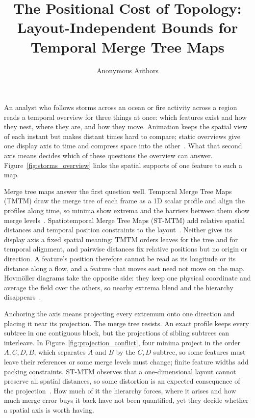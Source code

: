 \documentclass[review]{vgtc}
\title{The Positional Cost of Topology:\\Layout-Independent Bounds for Temporal Merge Tree Maps}
\author{Anonymous Authors}
\begin{document}
\maketitle
\raggedbottom
\setlength{\emergencystretch}{1.5em}
An analyst who follows storms across an ocean or fire activity across a region reads a temporal overview for three things at once: which features exist and how they nest, where they are, and how they move. Animation keeps the spatial view of each instant but makes distant times hard to compare; static overviews give one display axis to time and compress space into the other~\cite{Tversky:2002:Animation,Robertson:2008:Animation,Bach:2017:STC}. What that second axis means decides which of these questions the overview can answer. Figure~\ref{fig:storms_overview} links the spatial supports of one feature to such a map.

Merge tree maps answer the first question well. Temporal Merge Tree Maps (TMTM) draw the merge tree of each frame as a 1D scalar profile and align the profiles along time, so minima show extrema and the barriers between them show merge levels~\cite{Koepp:2023:TMTM}. Spatiotemporal Merge Tree Maps (ST-MTM) add relative spatial distances and temporal position constraints to the layout~\cite{STMTM:2026}. Neither gives its display axis a fixed spatial meaning: TMTM orders leaves for the tree and for temporal alignment, and pairwise distances fix relative positions but no origin or direction. A feature's position therefore cannot be read as its longitude or its distance along a flow, and a feature that moves east need not move on the map. Hovm\"oller diagrams take the opposite side: they keep one physical coordinate and average the field over the others, so nearby extrema blend and the hierarchy disappears~\cite{Hovmoller:1949}.

Anchoring the axis means projecting every extremum onto one direction and placing it near its projection. The merge tree resists. An exact profile keeps every subtree in one contiguous block, but the projections of sibling subtrees can interleave. In Figure~\ref{fig:projection_conflict}, four minima project in the order $A,C,D,B$, which separates $A$ and $B$ by the $C,D$ subtree, so some features must leave their references or some merge levels must change; finite feature widths add packing constraints. ST-MTM observes that a one-dimensional layout cannot preserve all spatial distances, so some distortion is an expected consequence of the projection~\cite{STMTM:2026}. How much of it the hierarchy forces, where it arises and how much merge error buys it back have not been quantified, yet they decide whether a spatial axis is worth having.
\end{document}
